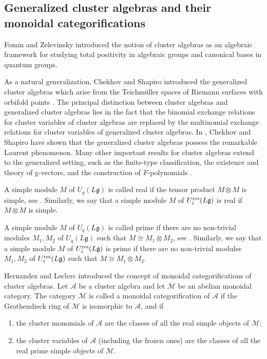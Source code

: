 \documentclass[11pt, reqno]{amsart}
\theoremstyle{plain}
\theoremstyle{definition}
\numberwithin{equation}{section}
\begin{document}
\subsection{Generalized cluster algebras and their monoidal categorifications}

Fomin and Zelevinsky introduced the notion of cluster algebras \cite{FZ02} as an algebraic framework for studying total positivity in algebraic groups and canonical bases in quantum groups.

As a natural generalization, Chekhov and Shapiro introduced the generalized cluster algebras which arise from the Teichm\"{u}ller spaces of Riemann surfaces with orbifold points \cite{CS14}. The principal distinction between cluster algebras and generalized cluster algebras lies in the fact that the binomial exchange relations for cluster variables of cluster algebras are replaced by the multinomial exchange relations for cluster variables of generalized cluster algebras. In \cite{CS14}, Chekhov and Shapiro have shown that the generalized cluster algebras possess the remarkable Laurent phenomenon. Many other important results for cluster algebras extend to the generalized setting, such as the finite-type classification, the existence and theory of g-vectors, and the construction of $F$-polynomials \cite{CS14, N15}.

A simple module $M$ of $U_q(L\mathfrak{g})$ is called real if the tensor product $M \otimes M$ is simple, see \cite{L03}. Similarly, we say that a simple module $M$ of $U_\varepsilon^{\rm res}(L\mathfrak{g})$ is real if $M \otimes M$ is simple.

A simple module $M$ of $U_q(L\mathfrak{g})$ is called prime if there are no non-trivial 
modules $M_1, M_2$ of $U_q(L\mathfrak{g})$ such that $M \cong M_1 \otimes M_2$, see \cite{CP97b}. Similarly, we say that a simple module $M$ of $U_\varepsilon^{\rm res}(L\mathfrak{g})$ is prime if there are no non-trivial modules $M_1, M_2$ of $U_\varepsilon^{\rm res}(L\mathfrak{g})$ such that $M \cong M_1 \otimes M_2$.

Hernandez and Leclerc \cite[Definition 2.1]{HL10} introduced the concept of monoidal categorifications of cluster algebras. Let $\mathcal{A}$ be a cluster algebra and let $\mathcal{M}$ be an abelian monoidal category. The category $\mathcal{M}$ is called a monoidal categorification of $\mathcal{A}$ if the Grothendieck ring of $\mathcal{M}$ is isomorphic to $\mathcal{A}$, and if 
\begin{enumerate}
\item the cluster monomials of $\mathcal{A}$ are the classes of all the real simple objects of $\mathcal{M}$;
\item the cluster variables of $\mathcal{A}$ (including the frozen ones) are the classes of all the real prime simple objects of $\mathcal{M}$. 
\end{enumerate} 
\end{document}
